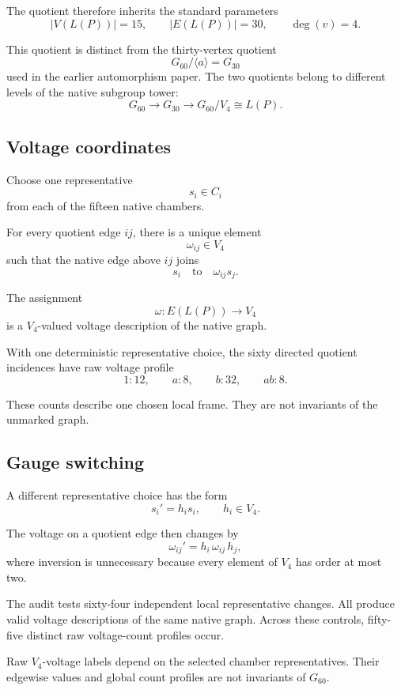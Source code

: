 The quotient therefore inherits the standard parameters
\[
|V(L(P))|=15,
\qquad
|E(L(P))|=30,
\qquad
\deg(v)=4.
\]

This quotient is distinct from the thirty-vertex quotient
\[
G_{60}/\langle a\rangle=G_{30}
\]
used in the earlier automorphism paper. The two quotients belong to
different levels of the native subgroup tower:
\[
G_{60}
\longrightarrow
G_{30}
\longrightarrow
G_{60}/V_4\cong L(P).
\]

\subsection{Voltage coordinates}

Choose one representative
\[
s_i\in C_i
\]
from each of the fifteen native chambers.

For every quotient edge \(ij\), there is a unique element
\[
\omega_{ij}\in V_4
\]
such that the native edge above \(ij\) joins
\[
s_i
\quad\text{to}\quad
\omega_{ij}s_j.
\]

The assignment
\[
\omega:E(L(P))\longrightarrow V_4
\]
is a \(V_4\)-valued voltage description of the native graph.

With one deterministic representative choice, the sixty directed
quotient incidences have raw voltage profile
\[
1:12,
\qquad
a:8,
\qquad
b:32,
\qquad
ab:8.
\]

These counts describe one chosen local frame. They are not invariants
of the unmarked graph.

\subsection{Gauge switching}

A different representative choice has the form
\[
s_i'=h_i s_i,
\qquad
h_i\in V_4.
\]

The voltage on a quotient edge then changes by
\[
\omega_{ij}'
=
h_i\,\omega_{ij}\,h_j,
\]
where inversion is unnecessary because every element of \(V_4\) has
order at most two.

The audit tests sixty-four independent local representative changes.
All produce valid voltage descriptions of the same native graph.
Across these controls, fifty-five distinct raw voltage-count profiles
occur.

\begin{proposition}
Raw \(V_4\)-voltage labels depend on the selected chamber
representatives. Their edgewise values and global count profiles are
not invariants of \(G_{60}\).
\end{proposition}

